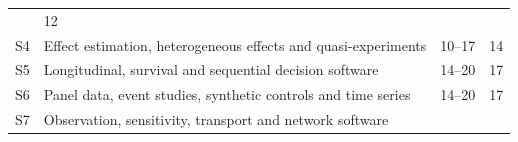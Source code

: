 \documentclass[
  11pt,
  a4paper,
]{article}
\begin{document}
\begin{longtable}[]{@{}llll@{}}
\begin{minipage}[t]{0.22\columnwidth}
\end{minipage} & \begin{minipage}[t]{0.22\columnwidth}\raggedright
12\strut
\end{minipage}\tabularnewline
\begin{minipage}[t]{0.22\columnwidth}\raggedright
S4\strut
\end{minipage} & \begin{minipage}[t]{0.22\columnwidth}\raggedright
Effect estimation, heterogeneous effects and quasi-experiments\strut
\end{minipage} & \begin{minipage}[t]{0.22\columnwidth}\raggedright
10--17\strut
\end{minipage} & \begin{minipage}[t]{0.22\columnwidth}\raggedright
14\strut
\end{minipage}\tabularnewline
\begin{minipage}[t]{0.22\columnwidth}\raggedright
S5\strut
\end{minipage} & \begin{minipage}[t]{0.22\columnwidth}\raggedright
Longitudinal, survival and sequential decision software\strut
\end{minipage} & \begin{minipage}[t]{0.22\columnwidth}\raggedright
14--20\strut
\end{minipage} & \begin{minipage}[t]{0.22\columnwidth}\raggedright
17\strut
\end{minipage}\tabularnewline
\begin{minipage}[t]{0.22\columnwidth}\raggedright
S6\strut
\end{minipage} & \begin{minipage}[t]{0.22\columnwidth}\raggedright
Panel data, event studies, synthetic controls and time series\strut
\end{minipage} & \begin{minipage}[t]{0.22\columnwidth}\raggedright
14--20\strut
\end{minipage} & \begin{minipage}[t]{0.22\columnwidth}\raggedright
17\strut
\end{minipage}\tabularnewline
\begin{minipage}[t]{0.22\columnwidth}\raggedright
S7\strut
\end{minipage} & \begin{minipage}[t]{0.22\columnwidth}\raggedright
Observation, sensitivity, transport and network software\strut

\end{minipage}
\end{longtable}
\end{document}
